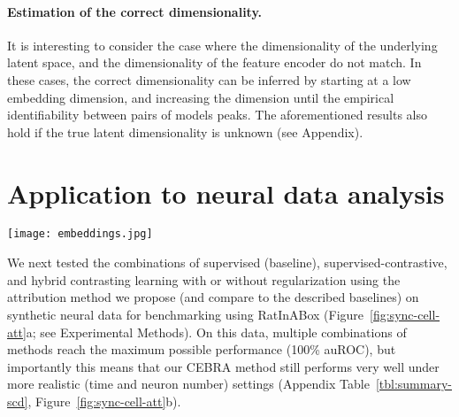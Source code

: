     \paragraph{Estimation of the correct dimensionality.}
        It is interesting to consider the case where the dimensionality of the underlying latent space, and the dimensionality of the feature encoder do not match. In these cases, the correct dimensionality can be inferred by starting at a low embedding dimension, and increasing the dimension until the empirical identifiability between pairs of models peaks. The aforementioned results also hold if the true latent dimensionality is unknown (see Appendix).
        
\vspace{-5pt}
\section{Application to neural data analysis}
\label{sec:application}

\begin{figure*}[t]
    \centering
    \vspace{-5pt}
    \texttt{[image: embeddings.jpg]}
    \caption{\textbf{Attribution scores of synthetic cell types.} \textbf{a}, the synthetic 4-cell type neural data, the simulated navigation and computed speed/head direction. \textbf{b}, embedding space is jointly trained with behavioral information about animal position (first 4 dimensions, top) and additional time-varying latent information (the remaining 10 dimensions) with our regularized hybrid contrastive learning setting. The position information was decoded as indicated by cross-validated $R^2$ score on held-out data. Training embedding is shown. \textbf{c}, time-series attribution map, showing high scores (lighter) for position. \textbf{d}, Attribution scores, zero-centered \& standardized across cells. \textbf{e}, auROC across training.}
    \label{fig:sync-cell-att}
    \vspace{-5pt}
\end{figure*}

We next tested the combinations of supervised (baseline), supervised-contrastive, and hybrid contrasting learning with or without regularization using the attribution method we propose (and compare to the described baselines) on synthetic neural data for benchmarking using RatInABox (Figure~\ref{fig:sync-cell-att}a; see Experimental Methods). 
On this data, multiple combinations of methods reach the maximum possible performance (100\% auROC), but importantly this means that our CEBRA method still performs very well under more realistic (time and neuron number) settings (Appendix Table~\ref{tbl:summary-scd}, Figure~\ref{fig:sync-cell-att}b).

